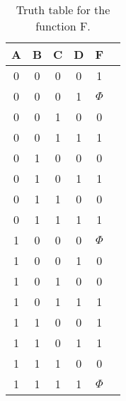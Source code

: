 \begin{table}[!h]
\begin{center}
    \begin{tabular}{|c|c|c|c|c|c|}
    \hline
         A & B & C & D & F \\
         \hline
         0 & 0 & 0 & 0 & 1 \\
         \hline
         0 & 0 & 0 & 1 & ${\Phi}$ \\
         \hline
         0 & 0 & 1 & 0 & 0 \\
         \hline
         0 & 0 & 1 & 1 & 1 \\
         \hline
         0 & 1 & 0 & 0 & 0 \\
         \hline
         0 & 1 & 0 & 1 & 1 \\
         \hline
         0 & 1 & 1 & 0 & 0 \\
         \hline
         0 & 1 & 1 & 1 & 1 \\
         \hline
         1 & 0 & 0 & 0 & ${\Phi}$ \\
         \hline
         1 & 0 & 0 & 1 & 0 \\
         \hline
         1 & 0 & 1 & 0 & 0 \\
         \hline
         1 & 0 & 1 & 1 & 1 \\
         \hline
         1 & 1 & 0 & 0 & 1 \\
         \hline
         1 & 1 & 0 & 1 & 1 \\
         \hline
         1 & 1 & 1 & 0 & 0 \\
         \hline
         1 & 1 & 1 & 1 & ${\Phi}$ \\
         \hline
    \hline
    \end{tabular}
    \caption{Truth table for the function F.}
    \label{part1-truth-table}
\end{center}
\end{table}







